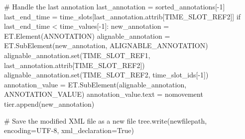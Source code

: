 \documentclass[
  letterpaper,
  DIV=11,
  numbers=noendperiod]{scrreprt}
\newenvironment{Shaded}{\begin{snugshade}}{\end{snugshade}}
\newcommand{\BuiltInTok}[1]{\textcolor[rgb]{0.00,0.23,0.31}{#1}}
\newcommand{\CommentTok}[1]{\textcolor[rgb]{0.37,0.37,0.37}{#1}}
\newcommand{\ControlFlowTok}[1]{\textcolor[rgb]{0.00,0.23,0.31}{#1}}
\newcommand{\DecValTok}[1]{\textcolor[rgb]{0.68,0.00,0.00}{#1}}
\newcommand{\NormalTok}[1]{\textcolor[rgb]{0.00,0.23,0.31}{#1}}
\newcommand{\OperatorTok}[1]{\textcolor[rgb]{0.37,0.37,0.37}{#1}}
\newcommand{\StringTok}[1]{\textcolor[rgb]{0.13,0.47,0.30}{#1}}
\newcommand{\VariableTok}[1]{\textcolor[rgb]{0.07,0.07,0.07}{#1}}
\begin{document}
\begin{Shaded}
\begin{Highlighting}[]
            \CommentTok{\# Handle the last annotation}
\NormalTok{            last\_annotation }\OperatorTok{=}\NormalTok{ sorted\_annotations[}\OperatorTok{{-}}\DecValTok{1}\NormalTok{]}
\NormalTok{            last\_end\_time }\OperatorTok{=}\NormalTok{ time\_slots[last\_annotation.attrib[}\StringTok{\textquotesingle{}TIME\_SLOT\_REF2\textquotesingle{}}\NormalTok{]]}
            \ControlFlowTok{if}\NormalTok{ last\_end\_time }\OperatorTok{\textless{}}\NormalTok{ time\_values[}\OperatorTok{{-}}\DecValTok{1}\NormalTok{]:}
\NormalTok{                new\_annotation }\OperatorTok{=}\NormalTok{ ET.Element(}\StringTok{\textquotesingle{}ANNOTATION\textquotesingle{}}\NormalTok{)}
\NormalTok{                alignable\_annotation }\OperatorTok{=}\NormalTok{ ET.SubElement(new\_annotation, }\StringTok{\textquotesingle{}ALIGNABLE\_ANNOTATION\textquotesingle{}}\NormalTok{)}
\NormalTok{                alignable\_annotation.}\BuiltInTok{set}\NormalTok{(}\StringTok{\textquotesingle{}TIME\_SLOT\_REF1\textquotesingle{}}\NormalTok{, last\_annotation.attrib[}\StringTok{\textquotesingle{}TIME\_SLOT\_REF2\textquotesingle{}}\NormalTok{])}
\NormalTok{                alignable\_annotation.}\BuiltInTok{set}\NormalTok{(}\StringTok{\textquotesingle{}TIME\_SLOT\_REF2\textquotesingle{}}\NormalTok{, time\_slot\_ids[}\OperatorTok{{-}}\DecValTok{1}\NormalTok{])}
\NormalTok{                annotation\_value }\OperatorTok{=}\NormalTok{ ET.SubElement(alignable\_annotation, }\StringTok{\textquotesingle{}ANNOTATION\_VALUE\textquotesingle{}}\NormalTok{)}
\NormalTok{                annotation\_value.text }\OperatorTok{=} \StringTok{\textquotesingle{}nomovement\textquotesingle{}}
\NormalTok{                tier.append(new\_annotation)}

    \CommentTok{\# Save the modified XML file as a new file}
\NormalTok{    tree.write(newfilepath, encoding}\OperatorTok{=}\StringTok{\textquotesingle{}UTF{-}8\textquotesingle{}}\NormalTok{, xml\_declaration}\OperatorTok{=}\VariableTok{True}\NormalTok{)}
\end{Highlighting}
\end{Shaded}
\end{document}
